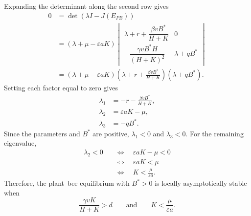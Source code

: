 \documentclass[11pt]{article}
\begin{document}
Expanding the determinant along the second row gives
\begin{align*}
    0 &= \det(\lambda I-J(E_{PB})) \\
      &= (\lambda+\mu-\varepsilon aK)
      \begin{vmatrix}
          \lambda+r+\dfrac{\beta vB^*}{H+K} & 0 \\[10pt]
          -\dfrac{\gamma vB^*H}{(H+K)^2} & \lambda+qB^*
      \end{vmatrix} \\
      &= (\lambda+\mu-\varepsilon aK)
      \left(\lambda+r+\frac{\beta vB^*}{H+K}\right)(\lambda+qB^*).
\end{align*}
Setting each factor equal to zero gives
\begin{align*}
    \lambda_1 &= -r-\frac{\beta vB^*}{H+K}, \\
    \lambda_2 &= \varepsilon aK-\mu, \\
    \lambda_3 &= -qB^*.
\end{align*}
Since the parameters and $B^*$ are positive, $\lambda_1<0$ and
$\lambda_3<0$. For the remaining eigenvalue,
\begin{align*}
    \lambda_2<0
    &\quad\Longleftrightarrow\quad \varepsilon aK-\mu<0 \\
    &\quad\Longleftrightarrow\quad \varepsilon aK<\mu \\
    &\quad\Longleftrightarrow\quad K<\frac{\mu}{\varepsilon a}.
\end{align*}
Therefore, the plant--bee equilibrium with $B^*>0$ is locally
asymptotically stable when
\[
    \frac{\gamma vK}{H+K}>d
    \qquad\text{and}\qquad
    K<\frac{\mu}{\varepsilon a}.
\]
\end{document}

